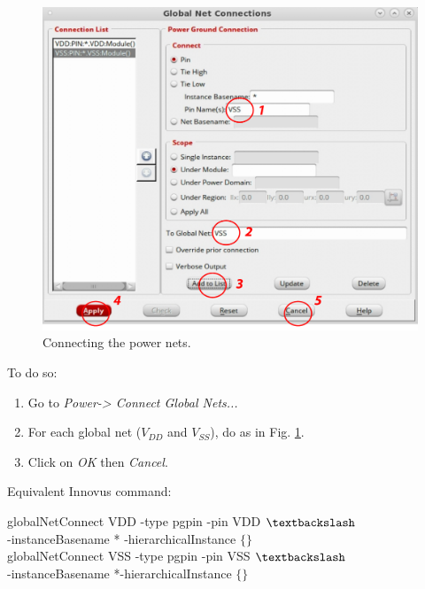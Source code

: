 	\parbox[t]{\dimexpr\textwidth-\leftmargin}{%
		\begin{figure}
			\vspace{0mm}
			\centering
			\vspace{-\baselineskip}
			\includegraphics[scale=0.28]{figures/lab5_backend/powernet.pdf}
			\caption{Connecting the power nets.}
			\label{fig_powernets}
		\end{figure}
	To do so:
	\begin{enumerate}
		\item Go to \textit{Power->  Connect Global Nets...}
		\item For each global net ($V_{DD}$ and $V_{SS}$), do as in Fig. \ref{fig_powernets}.
		\item Click on \textit{OK} then \textit{Cancel}.

\end{enumerate}
Equivalent Innovus command:
\begin{codeline}
globalNetConnect VDD -type pgpin -pin VDD $\textbackslash$ \\-instanceBasename * -hierarchicalInstance $\{\}$ \\
globalNetConnect VSS -type pgpin -pin VSS  $\textbackslash$ \\ -instanceBasename *-hierarchicalInstance $\{\}$ 
\end{codeline}
	} 
			\vspace{8mm}

